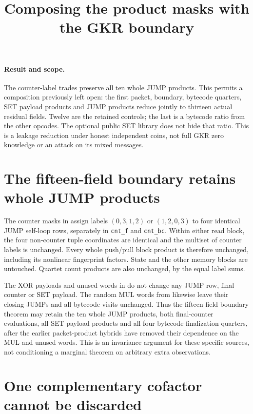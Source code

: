 \documentclass[11pt]{article}
\title{Composing the product masks with the GKR boundary}
\author{}
\date{}
\begin{document}
\maketitle
\vspace{-2em}

\paragraph{Result and scope.} The counter-label trades preserve all ten whole JUMP products. This permits a composition previously left open: the first packet, boundary, bytecode quarters, SET payload products and JUMP products reduce jointly to thirteen actual residual fields. Twelve are the retained controls; the last is a bytecode ratio from the other opcodes. The optional public SET library does not hide that ratio. This is a leakage reduction under honest independent coins, not full GKR zero knowledge or an attack on its mixed messages.

\section{The fifteen-field boundary retains whole JUMP products}

The counter masks in  assign labels $(0,3,1,2)$ or $(1,2,0,3)$ to four identical JUMP self-loop rows, separately in \texttt{cnt\_f} and \texttt{cnt\_bc}. Within either read block, the four non-counter tuple coordinates are identical and the multiset of counter labels is unchanged. Every whole push/pull block product is therefore unchanged, including its nonlinear fingerprint factors. State and the other memory blocks are untouched. Quartet count products are also unchanged, by the equal label sums.

The XOR payloads and unused words in  do not change any JUMP row, final counter or SET payload. The random MUL words from  likewise leave their closing JUMPs and all bytecode visits unchanged. Thus the fifteen-field boundary theorem may retain the ten whole JUMP products, both final-counter evaluations, all SET payload products and all four bytecode finalization quarters, after the earlier packet-product hybrids have removed their dependence on the MUL and unused words. This is an invariance argument for these specific sources, not conditioning a marginal theorem on arbitrary extra observations.

\section{One complementary cofactor cannot be discarded}
\end{document}
